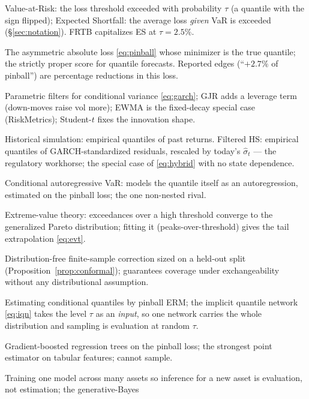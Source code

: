 \documentclass[11pt]{article}
\theoremstyle{remark}
\begin{document}
\begin{description}[leftmargin=1.6em,itemsep=1pt,font=\normalfont\bfseries]
\item[VaR / ES] Value-at-Risk: the loss threshold exceeded with
probability $\tau$ (a quantile with the sign flipped); Expected
Shortfall: the average loss \emph{given} VaR is exceeded
(\S\ref{sec:notation}). FRTB capitalizes ES at $\tau=2.5\%$.
\item[Pinball (check) loss] The asymmetric absolute loss
\eqref{eq:pinball} whose minimizer is the true quantile; the strictly
proper score for quantile forecasts. Reported edges (``$+2.7\%$ of
pinball'') are percentage reductions in this loss.
\item[GARCH-$t$ / GJR / EWMA] Parametric filters for conditional
variance \eqref{eq:garch}; GJR adds a leverage term (down-moves raise
vol more); EWMA is the fixed-decay special case (RiskMetrics);
Student-$t$ fixes the innovation shape.
\item[HS / FHS] Historical simulation: empirical quantiles of past
returns. Filtered HS: empirical quantiles of GARCH-standardized
residuals, rescaled by today's $\widehat\sigma_t$ --- the regulatory
workhorse; the special case of \eqref{eq:hybrid} with no state
dependence.
\item[CAViaR] Conditional autoregressive VaR: models the quantile
itself as an autoregression, estimated on the pinball loss; the one
non-nested rival.
\item[EVT / GPD / POT] Extreme-value theory: exceedances over a high
threshold converge to the generalized Pareto distribution; fitting it
(peaks-over-threshold) gives the tail extrapolation \eqref{eq:evt}.
\item[Conformal prediction] Distribution-free finite-sample correction
sized on a held-out split (Proposition~\ref{prop:conformal}); guarantees
coverage under exchangeability without any distributional assumption.
\item[Quantile regression / IQN] Estimating conditional quantiles by
pinball ERM; the implicit quantile network \eqref{eq:iqn} takes the
level $\tau$ as an \emph{input}, so one network carries the whole
distribution and sampling is evaluation at random $\tau$.
\item[GBM (trees)] Gradient-boosted regression trees on the pinball
loss; the strongest point estimator on tabular features; cannot sample.
\item[Amortization] Training one model across many assets so inference
for a new asset is evaluation, not estimation; the generative-Bayes

\end{description}
\end{document}
